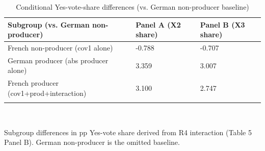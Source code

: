 \begin{table}[tbp] \centering
{}

\caption{Conditional Yes-vote-share differences (vs. German non-producer baseline)}
\label{tab:T5_cond_means}
\begin{tabularx}{\linewidth}{@{}lCC@{}}

\toprule
{Subgroup (vs. German non-producer)}&{Panel A (X2 share)}&{Panel B (X3 share)} \tabularnewline
\midrule \addlinespace[\belowrulesep]
French non-producer (cov1 alone)&-0.788&-0.707 \tabularnewline
German producer (abs producer alone)&3.359&3.007 \tabularnewline
French producer (cov1+prod+interaction)&3.100&2.747 \tabularnewline
\bottomrule \addlinespace[\belowrulesep]

\end{tabularx}
\\ \parbox{\linewidth}{\footnotesize Subgroup differences in pp Yes-vote share derived from R4 interaction (Table 5 Panel B). German non-producer is the omitted baseline.}
\end{table}
